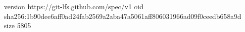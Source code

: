 version https://git-lfs.github.com/spec/v1
oid sha256:1b90dee6aff0ad24fab2569a2aba47a5061aff806031966ad09f0ceedb658a9d
size 5805
